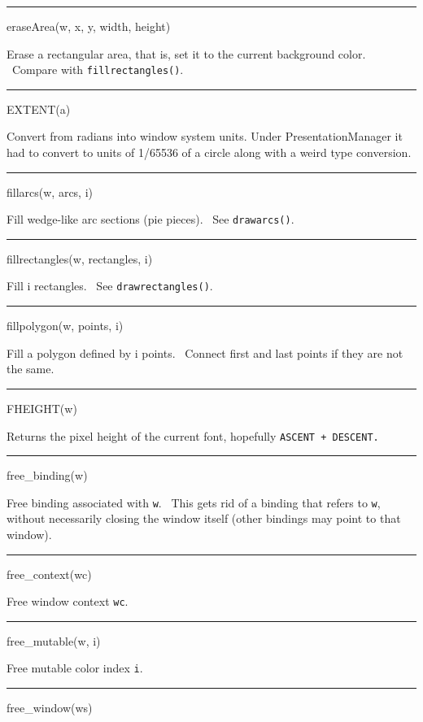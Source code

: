 \bigskip\hrule\vspace{0.1cm}
\noindent
eraseArea(w, x, y, width, height)


Erase a rectangular area, that is, set it to the current background color. \ Compare with \texttt{fillrectangles()}.


\bigskip\hrule\vspace{0.1cm}
\noindent
EXTENT(a)


Convert from radians into window system units. Under
PresentationManager it had to convert to units of 1/65536 of a circle
along with a weird type conversion.


\bigskip\hrule\vspace{0.1cm}
\noindent
fillarcs(w, arcs, i)


Fill wedge-like arc sections (pie pieces). \ See \texttt{drawarcs()}.


\bigskip\hrule\vspace{0.1cm}
\noindent
fillrectangles(w, rectangles, i)


Fill i rectangles. \ See \texttt{drawrectangles()}.


\bigskip\hrule\vspace{0.1cm}
\noindent
fillpolygon(w, points, i)


Fill a polygon defined by i points. \ Connect first and last points if they are not the same.


\bigskip\hrule\vspace{0.1cm}
\noindent
FHEIGHT(w)


Returns the pixel height of the current font, hopefully \texttt{ASCENT + DESCENT.}


\bigskip\hrule\vspace{0.1cm}
\noindent
free\_binding(w)


Free binding associated with \texttt{w}. \ This gets rid of a binding that refers to \texttt{w}, without necessarily
closing the window itself (other bindings may point to that window).


\bigskip\hrule\vspace{0.1cm}
\noindent
free\_context(wc)


Free window context \texttt{wc}.


\bigskip\hrule\vspace{0.1cm}
\noindent
free\_mutable(w, i)


Free mutable color index \texttt{i}.


\bigskip\hrule\vspace{0.1cm}
\noindent
free\_window(ws)


